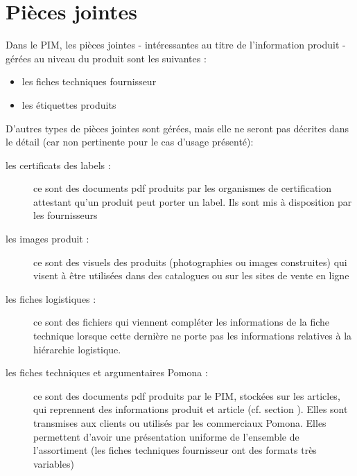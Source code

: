 

        \section{Pièces jointes}
            \label{pieces_jointes}

            Dans le PIM, les pièces jointes - intéressantes au titre de l'information produit - gérées au niveau du produit sont les suivantes :
            \begin{itemize}
                \item les fiches techniques fournisseur
                \item les étiquettes produits
            \end{itemize}
    
            D'autres types de pièces jointes sont gérées, mais elle ne seront pas décrites dans le détail (car non pertinente pour le cas d'usage présenté):
            \begin{description}
                \item[les certificats des labels : ] ce sont des documents pdf produits par les organismes de certification attestant qu'un produit peut porter un label. Ils sont mis à disposition par les fournisseurs
                \item[les images produit : ] ce sont des visuels des produits (photographies ou images construites) qui visent à être utilisées dans des catalogues ou sur les sites de vente en ligne
                \item[les fiches logistiques : ] ce sont des fichiers qui viennent compléter les informations de la fiche technique lorsque cette dernière ne porte pas les informations relatives à la hiérarchie logistique. 
                \item[les fiches techniques et argumentaires Pomona : ] ce sont des documents pdf produits par le PIM, stockées sur les articles, qui reprennent des informations produit et article (cf. section ). Elles sont transmises aux clients ou utilisés par les commerciaux Pomona.
                Elles permettent d'avoir une présentation uniforme de l'ensemble de l'assortiment (les fiches techniques fournisseur ont des formats très variables)
            \end{description}


